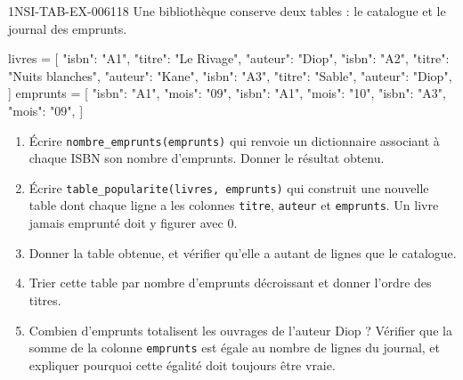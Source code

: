\begin{exercice}{1NSI-TAB-EX-006}{1}{18}
Une bibliothèque conserve deux tables : le catalogue et le journal des emprunts.
\begin{python}
livres = [
    {"isbn": "A1", "titre": "Le Rivage", "auteur": "Diop"},
    {"isbn": "A2", "titre": "Nuits blanches", "auteur": "Kane"},
    {"isbn": "A3", "titre": "Sable", "auteur": "Diop"},
]
emprunts = [
    {"isbn": "A1", "mois": "09"},
    {"isbn": "A1", "mois": "10"},
    {"isbn": "A3", "mois": "09"},
]
\end{python}
\begin{enumerate}
  \item Écrire \lstinline{nombre_emprunts(emprunts)} qui renvoie un dictionnaire
    associant à chaque ISBN son nombre d'emprunts. Donner le résultat obtenu.
  \item Écrire \lstinline{table_popularite(livres, emprunts)} qui construit une
    nouvelle table dont chaque ligne a les colonnes \lstinline{titre},
    \lstinline{auteur} et \lstinline{emprunts}. Un livre jamais emprunté doit y
    figurer avec $0$.
  \item Donner la table obtenue, et vérifier qu'elle a autant de lignes que le
    catalogue.
  \item Trier cette table par nombre d'emprunts décroissant et donner l'ordre
    des titres.
  \item Combien d'emprunts totalisent les ouvrages de l'auteur Diop ? Vérifier
    que la somme de la colonne \lstinline{emprunts} est égale au nombre de
    lignes du journal, et expliquer pourquoi cette égalité doit toujours être
    vraie.
\end{enumerate}
\end{exercice}
